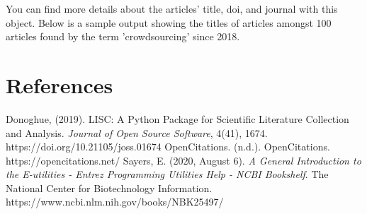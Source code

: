 \documentclass{article}
\begin{document}
You can find more details about the articles' title, doi, and journal with this object.  Below is a sample output showing the titles of articles amongst 100 articles found by the term 'crowdsourcing' since 2018.


\section{References}
 Donoghue, (2019). LISC: A Python Package for Scientific Literature Collection and Analysis. \emph{Journal of Open Source Software}, 4(41), 1674.
https://doi.org/10.21105/joss.01674
\newline
\newline
OpenCitations. (n.d.). OpenCitations. https://opencitations.net/
\newline
\newline
Sayers, E. (2020, August 6). \emph{A General Introduction to the E-utilities - Entrez Programming Utilities Help - NCBI Bookshelf}. The National Center for Biotechnology Information. https://www.ncbi.nlm.nih.gov/books/NBK25497/
\end{document}
